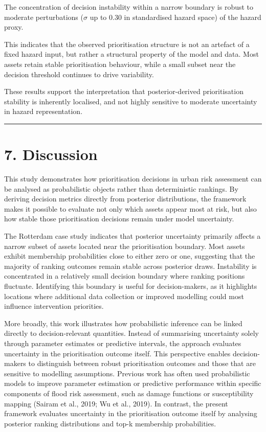 \documentclass[
]{article}
\begin{document}
The concentration of decision instability within a narrow boundary is
robust to moderate perturbations (\(\sigma\) up to 0.30 in standardised
hazard space) of the hazard proxy.

This indicates that the observed prioritisation structure is not an
artefact of a fixed hazard input, but rather a structural property of
the model and data. Most assets retain stable prioritisation behaviour,
while a small subset near the decision threshold continues to drive
variability.

These results support the interpretation that posterior-derived
prioritisation stability is inherently localised, and not highly
sensitive to moderate uncertainty in hazard representation.

\begin{center}\rule{0.5\linewidth}{0.5pt}\end{center}

\section{7. Discussion}\label{discussion}

This study demonstrates how prioritisation decisions in urban risk
assessment can be analysed as probabilistic objects rather than
deterministic rankings. By deriving decision metrics directly from
posterior distributions, the framework makes it possible to evaluate not
only which assets appear most at risk, but also how stable those
prioritisation decisions remain under model uncertainty.

The Rotterdam case study indicates that posterior uncertainty primarily
affects a narrow subset of assets located near the prioritisation
boundary. Most assets exhibit membership probabilities close to either
zero or one, suggesting that the majority of ranking outcomes remain
stable across posterior draws. Instability is concentrated in a
relatively small decision boundary where ranking positions fluctuate.
Identifying this boundary is useful for decision-makers, as it
highlights locations where additional data collection or improved
modelling could most influence intervention priorities.

More broadly, this work illustrates how probabilistic inference can be
linked directly to decision-relevant quantities. Instead of summarising
uncertainty solely through parameter estimates or predictive intervals,
the approach evaluates uncertainty in the prioritisation outcome itself.
This perspective enables decision-makers to distinguish between robust
prioritisation outcomes and those that are sensitive to modelling
assumptions. Previous work has often used probabilistic models to
improve parameter estimation or predictive performance within specific
components of flood risk assessment, such as damage functions or
susceptibility mapping (Sairam et al., 2019; Wu et al., 2019). In
contrast, the present framework evaluates uncertainty in the
prioritisation outcome itself by analysing posterior ranking
distributions and top-k membership probabilities.
\end{document}
